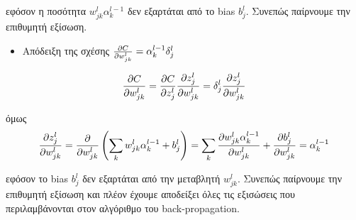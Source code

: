 \documentclass[11pt]{article} %
\numberwithin{equation}{subsection}
\begin{document}
εφόσον η ποσότητα $w_{jk}^{l} \alpha_{k}^{l-1}$ δεν εξαρτάται από το bias $b_{j}^{l}$. Συνεπώς παίρνουμε την επιθυμητή εξίσωση.

\begin{itemize}
\item Απόδειξη της σχέσης $\pdv{C}{w_{jk}^{l}} = \alpha_{k}^{l-1} \delta_{j}^{l}$
\end{itemize}
\begin{align*}
\pdv{C}{w_{jk}^{l}} = \pdv{C}{z_{j}^{l}} \pdv{z_{j}^{l}}{w_{jk}^{l}} = \delta_{j}^{l} \pdv{z_{j}^{l}}{w_{jk}^{l}}
\end{align*}

όμως
\begin{align*}
\displaystyle \pdv{z_{j}^{l}}{w_{jk}^{l}} = \pdv{}{w_{jk}^{l}} \left( \sum_{k} w_{jk}^{l} \alpha_{k}^{l-1} + b_{j}^{l}\right) = \sum_{k} \pdv{w_{jk}^{l} \alpha_{k}^{l-1}}{w_{jk}^{l}} + \pdv{ b_{j}^{l}}{w_{jk}^{l}} = \alpha_{k}^{l-1}
\end{align*}

εφόσον το bias $ b_{j}^{l}$ δεν εξαρτάται από την μεταβλητή $w_{jk}^{l}$. Συνεπώς παίρνουμε την επιθυμητή εξίσωση και πλέον έχουμε αποδείξει όλες τις εξισώσεις που περιλαμβάνονται στον αλγόριθμο του back-propagation.\\


\newpage
\end{document}
